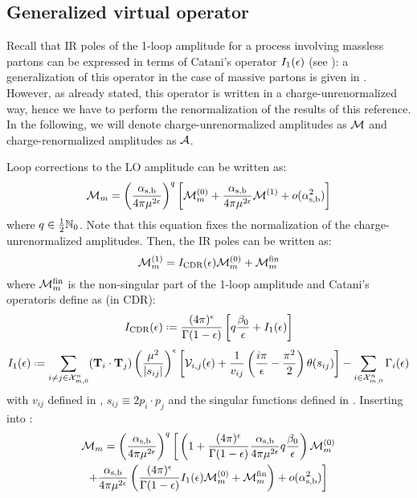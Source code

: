 \subsection{Generalized virtual operator}

Recall that IR poles of the 1-loop amplitude for a process involving massless partons can be expressed in terms of Catani's operator $ I_1(\epsilon) $ (see ): a generalization of this operator in the case of massive partons is given in \cite{Catani-2001}. However, as already stated, this operator is written in a charge-unrenormalized way, hence we have to perform the renormalization of the results of this reference. In the following, we will denote charge-unrenormalized amplitudes as $ \mathcal{M} $ and charge-renormalized amplitudes as $ \mathcal{A} $.

Loop corrections to the LO amplitude can be written as:
\begin{equation}
  \mathcal{M}_m = \left( \frac{\alpha_\text{s,b}}{4\pi \mu^{2\epsilon}} \right)^q \left[ \mathcal{M}_m^{(0)} + \frac{\alpha_\text{s,b}}{4\pi \mu^{2\epsilon}} \mathcal{M}^{(1)} + o(\alpha_\text{s,b}^2) \right]
  \label{eq:ampl-non-ren}
\end{equation}
where $ q \in \frac{1}{2} \mathbb{N}_0 $. Note that this equation fixes the normalization of the charge-unrenormalized amplitudes. Then, the IR poles can be written as:
\begin{equation}
  \mathcal{M}_m^{(1)} = I_\text{CDR}(\epsilon) \mathcal{M}_m^{(0)} + \mathcal{M}_m^\text{fin}
  \label{eq:gen-cat-form}
\end{equation}
where $ \mathcal{M}_m^\text{fin} $ is the non-singular part of the 1-loop amplitude and Catani's operator\footnotemark is define as (in CDR):
\begin{equation}
  \irs(\de) \defeq \frac{(4\pi)^\de}{\Gamma(1-\de)} \left[ q \frac{\beta_0}{\de} + \ioo(\de) \right]
\end{equation}
\begin{equation}
  \ioo(\de) \defeq \sum_{i \neq j \in \fsp{n}{m}} (\cc) \left( \frac{\mu^2}{\abs{s_{ij}}} \right)^\de \left[ \ns_{i,j}(\de) + \frac{1}{v_{ij}} \left( \frac{i\pi}{\de} - \frac{\pi^2}{2} \right) \theta(s_{ij}) \right] - \sum_{i \in \fsp{n}{m}} \Gamma_i(\de)
  \label{eq:gen-cat}
\end{equation}
with $ v_{ij} $ defined in , $ s_{ij} \equiv 2 p_i \cdot p_j $ and the singular functions defined in . Inserting  into :
\begin{multline*}
  \mathcal{M}_m = \left( \frac{\alpha_\text{s,b}}{4\pi \mu^{2\epsilon}} \right)^q \bigg[ \left( 1 + \frac{(4\pi)^\epsilon}{\Gamma(1-\epsilon)} \frac{\alpha_\text{s,b}}{4\pi \mu^{2\epsilon}} q \frac{\beta_0}{\epsilon} \right) \mathcal{M}_m^{(0)} \\
  + \frac{\alpha_\text{s,b}}{4\pi \mu^{2\epsilon}} \left( \frac{(4\pi)^\epsilon}{\Gamma(1-\epsilon)} I_1(\epsilon) \mathcal{M}_m^{(0)} + \mathcal{M}_m^\text{fin} \right) + o(\alpha_\text{s,b}^2) \bigg]
\end{multline*}
